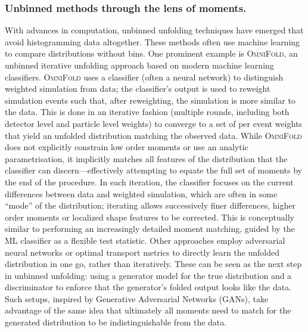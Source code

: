 {{        \subsubsection{Unbinned methods through the lens of moments.}
            With advances in computation, unbinned unfolding techniques have emerged that avoid histogramming data altogether.
            These methods often use machine learning to compare distributions without bins.
            One prominent example is \textsc{OmniFold}, an unbinned iterative unfolding approach based on modern machine learning classifiers.
            \textsc{OmniFold} uses a classifier (often a neural network) to distinguish weighted simulation from data; the classifier's output is used to reweight simulation events such that, after reweighting, the simulation is more similar to the data.
            This is done in an iterative fashion (multiple rounds, including both detector level and particle level weights) to converge to a set of per event weights that yield an unfolded distribution matching the observed data.
            While \textsc{OmniFold} does not explicitly constrain low order moments or use an analytic parametrisation, it implicitly matches all features of the distribution that the classifier can discern---effectively attempting to equate the full set of moments by the end of the procedure.
            In each iteration, the classifier focuses on the current differences between data and weighted simulation, which are often in some ``mode'' of the distribution; iterating allows successively finer differences, higher order moments or localized shape features to be corrected.
            This is conceptually similar to performing an increasingly detailed moment matching, guided by the ML classifier as a flexible test statistic.
            Other approaches employ adversarial neural networks or optimal transport metrics to directly learn the unfolded distribution in one go, rather than iteratively.
            These can be seen as the next step in unbinned unfolding: using a generator model for the true distribution and a discriminator to enforce that the generator's folded output looks like the data.
            Such setups, inspired by Generative Adversarial Networks (GANs), take advantage of the same idea that ultimately all moments need to match for the generated distribution to be indistinguishable from the data.
            
}}
